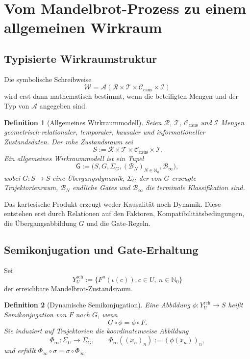\documentclass[11pt,a4paper]{article}
\newtheorem{definition}{Definition}[section]
\theoremstyle{remark}
\newcommand{\N}{\mathbb{N}}
\begin{document}
\section{Vom Mandelbrot-Prozess zu einem allgemeinen Wirkraum}
\label{sec:wirkraum-korrespondenz}

\subsection{Typisierte Wirkraumstruktur}

Die symbolische Schreibweise
\[
  \mathcal W=\mathcal A
  (\mathcal R\times\mathcal T\times\mathcal C_{\mathrm{caus}}\times\mathcal I)
\]
wird erst dann mathematisch bestimmt, wenn die beteiligten Mengen und der Typ
von \(\mathcal A\) angegeben sind.

\begin{definition}[Allgemeines Wirkraummodell]
Seien \(\mathcal R\), \(\mathcal T\), \(\mathcal C_{\mathrm{caus}}\) und
\(\mathcal I\) Mengen geometrisch-relationaler, temporaler, kausaler und
informationeller Zustandsdaten. Der rohe Zustandsraum sei
\[
  S:=\mathcal R\times\mathcal T\times
  \mathcal C_{\mathrm{caus}}\times\mathcal I.
\]
Ein allgemeines Wirkraummodell ist ein Tupel
\[
  \mathsf G:=\bigl(S,G,\Sigma_G,(\mathcal B_N)_{N\in\N_0},
  \mathcal B_\infty\bigr),
\]
wobei \(G:S\to S\) eine Übergangsdynamik, \(\Sigma_G\) der von \(G\)
erzeugte Trajektorienraum, \(\mathcal B_N\) endliche Gates und
\(\mathcal B_\infty\) die terminale Klassifikation sind.
\end{definition}

Das kartesische Produkt erzeugt weder Kausalität noch Dynamik. Diese entstehen
erst durch Relationen auf den Faktoren, Kompatibilitätsbedingungen, die
Übergangsabbildung \(G\) und die Gate-Regeln.

\subsection{Semikonjugation und Gate-Erhaltung}

Sei
\[
  Y_U^{\mathrm{rch}}:=
  \{F^n(\iota(c)):c\in U,\ n\in\N_0\}
\]
der erreichbare Mandelbrot-Zustandsraum.

\begin{definition}[Dynamische Semikonjugation]
Eine Abbildung \(\phi:Y_U^{\mathrm{rch}}\to S\) heißt Semikonjugation von
\(F\) nach \(G\), wenn
\[
  \boxed{G\circ\phi=\phi\circ F}.
\]
Sie induziert auf Trajektorien die koordinatenweise Abbildung
\[
  \Phi_\infty:\Sigma_U\longrightarrow\Sigma_G,
  \qquad
  \Phi_\infty((x_n)_n):=(\phi(x_n))_n,
\]
und erfüllt \(\Phi_\infty\circ\sigma=\sigma\circ\Phi_\infty\).
\end{definition}
\end{document}
